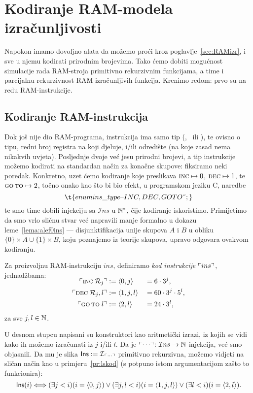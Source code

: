 \section{Kodiranje RAM-modela izračunljivosti}

Napokon imamo dovoljno alata da možemo proći kroz poglavlje~\ref{sec:RAMizr}, i sve u njemu kodirati prirodnim brojevima. Tako ćemo dobiti mogućnost simulacije rada RAM-stroja primitivno rekurzivnim funkcijama, a time i parcijalnu rekurzivnost RAM-izračunljivih funkcija. Krenimo redom: prvo su na redu RAM-instrukcije.

\subsection{Kodiranje RAM-instrukcija}

Dok još nije dio RAM-programa, instrukcija ima samo tip (\inc, \dec\ ili \goto), te ovisno o tipu, redni broj registra na koji djeluje, i\slash ili odredište (na koje zasad nema nikakvih uvjeta). Posljednje dvoje već jesu prirodni brojevi, a tip instrukcije možemo kodirati na standardan način za konačne skupove: fiksiramo neki poredak. Konkretno, uzet ćemo kodiranje koje preslikava $\textsc{inc}\mapsto0$, $\textsc{dec}\mapsto1$, te $\textsc{go\,to}\mapsto2$, točno onako kao što bi bio efekt, u programskom jeziku C, naredbe
\begin{equation}
\t{enum ins\_type \string{ INC, DEC, GOTO \string};}
\end{equation}
te smo time dobili injekciju sa $\mathcal Ins$ u ${\mathbb N}^*$, čije kodiranje iskoristimo. Primijetimo da smo vrlo sličnu stvar već napravili manje formalno u dokazu leme~\ref{lema:alef0ins} --- disjunktifikacija unije skupova $A$ i $B$ u obliku $\{0\}\times A\cup\{1\}\times B$, koju poznajemo iz teorije skupova, upravo odgovara ovakvom kodiranju.

\begin{definicija}\label{def:kodIns}
Za proizvoljnu RAM-instrukciju $ins$, definiramo \emph{kod instrukcije} $\ulcorner ins\urcorner$, jednadžbama:
\begin{align}
\SwapAboveDisplaySkip
    \kins{\incr j}&:=\langle0,j\rangle&&=6\cdot3^j\text,\\
    \kins{\decr jl}&:=\langle1,j,l\rangle&&=60\cdot3^j\cdot5^l\text,\\
    \kins{\goto\;l}&:=\langle2,l\rangle&&=24\cdot3^l\text,
\end{align}
za sve $j,l\in{\mathbb N}$.
\end{definicija}
U desnom stupcu napisani su konstruktori kao aritmetički izrazi, iz kojih se vidi kako ih možemo izračunati iz $j$ i\slash ili $l$. Da je $\ulcorner\cdots\urcorner\colon\mathcal Ins\to{\mathbb N}$ injekcija, već smo objasnili. Da mu je slika $\mathsf{Ins}:=\mathcal I_{\,\ulcorner\cdots\urcorner}$ primitivno rekurzivna, možemo vidjeti na sličan način kao u primjeru~\ref{pr:lskod} (s potpuno istom argumentacijom zašto to funkcionira):
\begin{equation}\label{eq:Insprn}
    \mathsf{Ins}(i)\Longleftrightarrow(\exists j<i)(i=\langle0,j\rangle)\lor(\exists j,l<i)(i=\langle1,j,l\rangle)\lor(\exists l<i)(i=\langle2,l\rangle)\text.
\end{equation}

